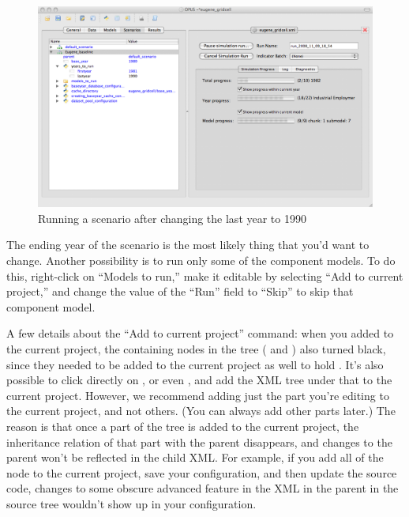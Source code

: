 \begin{figure}[htp]
\begin{center}
\includegraphics[scale=0.4]{part-gui/images/scenario-manager-change-lastyear.png}
\end{center}
\caption{Running a scenario after changing the last year to 1990}
\label{fig:scenario-manager-change-lastyear}
\end{figure}

The ending year of the scenario is the most likely thing that you'd want to
change.  Another possibility is to run only some of the component models.
To do this, right-click on ``Models to run,'' make it editable by
selecting ``Add to current project,'' and change the value of the ``Run''
field to ``Skip'' to skip that component model.

A few details about the ``Add to current project'' command: when you added
 to the current project, the containing nodes in the tree
( and ) also turned black, since
they needed to be added to the current project as well to hold
.  It's also possible to click directly on
, or even , and add the XML tree
under that to the current project.  However, we recommend adding just the
part you're editing to the current project, and not others.  (You can
always add other parts later.)  The reason is that once a part of the tree
is added to the current project, the inheritance relation of that part with
the parent disappears, and changes to the parent won't be reflected in the
child XML\@.  For example, if you add all of the 
node to the current project, save your configuration, and then update the
source code, changes to some obscure advanced feature in the XML in the
parent in the source tree wouldn't show up in your configuration.
